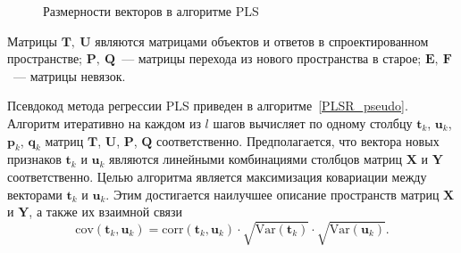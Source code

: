 \documentclass[12pt,twoside]{article}
\newcommand{\bY}{\mathbf{Y}}
\newcommand{\bX}{\mathbf{X}}
\newcommand{\bu}{\mathbf{u}}
\newcommand{\bt}{\mathbf{t}}
\newcommand{\bp}{\mathbf{p}}
\newcommand{\bq}{\mathbf{q}}
\newcommand{\bP}{\mathbf{P}}
\newcommand{\bT}{\mathbf{T}}
\newcommand{\bQ}{\mathbf{Q}}
\newcommand{\bE}{\mathbf{E}}
\newcommand{\bF}{\mathbf{F}}
\newcommand{\bU}{\mathbf{U}}
\begin{document}
\hspace{1cm}
\begin{figure}[H]
\centering
{}
\caption{Размерности векторов в алгоритме PLS}
\end{figure}
Матрицы $\bT,\ \bU$ являются матрицами объектов и ответов в спроектированном пространстве; $\bP,\ \bQ$~--- матрицы перехода из нового пространства в старое; $\bE,\ \bF$~--- матрицы невязок. 

Псевдокод метода регрессии PLS приведен в алгоритме~\ref{PLSR_pseudo}. Алгоритм итеративно на каждом из $l$ шагов вычисляет по одному столбцу $\bt_k$, $\bu_k$, $\bp_k$, $\bq_k$ матриц $\bT$, $\bU$, $\bP$, $\bQ$ соответственно. Предполагается, что вектора новых признаков $\bt_k$ и $\bu_k$ являются линейными комбинациями столбцов матриц $\bX$ и $\bY$ соответственно.
Целью алгоритма является максимизация ковариации между векторами $\bt_k$ и $\bu_k$. Этим достигается наилучшее описание пространств матриц $\bX$ и $\bY$, а также их взаимной связи
\[
	\text{cov} (\bt_k, \bu_k) = \text{corr} (\bt_k, \bu_k) \cdot \sqrt{\text{Var}(\bt_k)} \cdot \sqrt{\text{Var}(\bu_k)}.
\]
\end{document}
